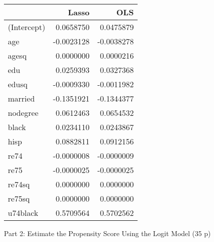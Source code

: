 \documentclass[
]{article}
\begin{document}
\begin{enumerate}
  \begin{longtable}[]{@{}lrr@{}}
  \toprule\noalign{}
  & Lasso & OLS \\
  \midrule\noalign{}
  \endhead
  \bottomrule\noalign{}
  \endlastfoot
  (Intercept) & 0.0658750 & 0.0475879 \\
  age & -0.0023128 & -0.0038278 \\
  agesq & 0.0000000 & 0.0000216 \\
  edu & 0.0259393 & 0.0327368 \\
  edusq & -0.0009330 & -0.0011982 \\
  married & -0.1351921 & -0.1344377 \\
  nodegree & 0.0612463 & 0.0654532 \\
  black & 0.0234110 & 0.0243867 \\
  hisp & 0.0882811 & 0.0912156 \\
  re74 & -0.0000008 & -0.0000009 \\
  re75 & -0.0000025 & -0.0000025 \\
  re74sq & 0.0000000 & 0.0000000 \\
  re75sq & 0.0000000 & 0.0000000 \\
  u74black & 0.5709564 & 0.5702562 \\
  \end{longtable}
\end{enumerate}

\begin{center}
{\LARGE Part 2: Estimate the Propensity Score Using the Logit Model (35 p)}
\end{center}

\noindent 
\end{document}
